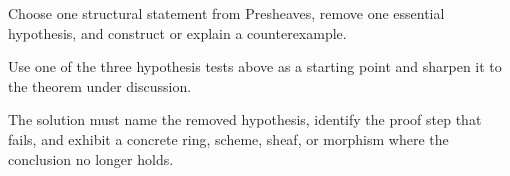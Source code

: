 \begin{exercise}\label{exr:vi12-expand-16}
Choose one structural statement from Presheaves, remove one essential hypothesis, and construct or explain a counterexample.
\end{exercise}
\begin{hint}
Use one of the three hypothesis tests above as a starting point and sharpen it to the theorem under discussion.
\end{hint}
\begin{solution}
The solution must name the removed hypothesis, identify the proof step that fails, and exhibit a concrete ring, scheme, sheaf, or morphism where the conclusion no longer holds.
\end{solution}

